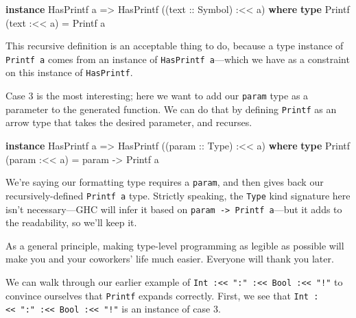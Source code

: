\documentclass[
  11pt,
]{book}
\newenvironment{Shaded}{}{}
\newcommand{\DataTypeTok}[1]{\textcolor[rgb]{0.56,0.13,0.00}{#1}}
\newcommand{\KeywordTok}[1]{\textcolor[rgb]{0.00,0.44,0.13}{\textbf{#1}}}
\newcommand{\NormalTok}[1]{#1}
\newcommand{\OperatorTok}[1]{\textcolor[rgb]{0.40,0.40,0.40}{#1}}
\newcommand{\OtherTok}[1]{\textcolor[rgb]{0.00,0.44,0.13}{#1}}
\theoremstyle{nonumberplain}
\begin{document}
\begin{Shaded}
\begin{Highlighting}[]
\KeywordTok{instance} \DataTypeTok{HasPrintf}\NormalTok{ a}
    \OtherTok{=\textgreater{}} \DataTypeTok{HasPrintf}\NormalTok{ ((}\OtherTok{text ::} \DataTypeTok{Symbol}\NormalTok{) }\OperatorTok{:\textless{}\textless{}}\NormalTok{ a) }\KeywordTok{where}
  \KeywordTok{type} \DataTypeTok{Printf}\NormalTok{ (text }\OperatorTok{:\textless{}\textless{}}\NormalTok{ a) }\OtherTok{=} \DataTypeTok{Printf}\NormalTok{ a}
\end{Highlighting}
\end{Shaded}

This recursive definition is an acceptable thing to do, because a type
instance of \texttt{Printf\ a} comes from an instance of
\texttt{HasPrintf\ a}---which we have as a constraint on this instance
of \texttt{HasPrintf}.

Case 3 is the most interesting; here we want to add our \texttt{param}
type as a parameter to the generated function. We can do that by
defining \texttt{Printf} as an arrow type that takes the desired
parameter, and recurses.

\begin{Shaded}
\begin{Highlighting}[]
\KeywordTok{instance} \DataTypeTok{HasPrintf}\NormalTok{ a}
    \OtherTok{=\textgreater{}} \DataTypeTok{HasPrintf}\NormalTok{ ((}\OtherTok{param ::} \DataTypeTok{Type}\NormalTok{) }\OperatorTok{:\textless{}\textless{}}\NormalTok{ a) }\KeywordTok{where}
  \KeywordTok{type} \DataTypeTok{Printf}\NormalTok{ (param }\OperatorTok{:\textless{}\textless{}}\NormalTok{ a) }\OtherTok{=}\NormalTok{ param }\OtherTok{{-}\textgreater{}} \DataTypeTok{Printf}\NormalTok{ a}
\end{Highlighting}
\end{Shaded}

We're saying our formatting type requires a \texttt{param}, and then
gives back our recursively-defined \texttt{Printf\ a} type. Strictly
speaking, the \texttt{Type} kind signature here isn't necessary---GHC
will infer it based on \texttt{param\ -\textgreater{}\ Printf\ a}---but
it adds to the readability, so we'll keep it.

As a general principle, making type-level programming as legible as
possible will make you and your coworkers' life much easier. Everyone
will thank you later.

We can walk through our earlier example of
\texttt{Int\ :\textless{}\textless{}\ ":"\ :\textless{}\textless{}\ Bool\ :\textless{}\textless{}\ "!"}
to convince ourselves that \texttt{Printf} expands correctly. First, we
see that
\texttt{Int\ :\textless{}\textless{}\ ":"\ :\textless{}\textless{}\ Bool\ :\textless{}\textless{}\ "!"}
is an instance of case 3.
\end{document}

